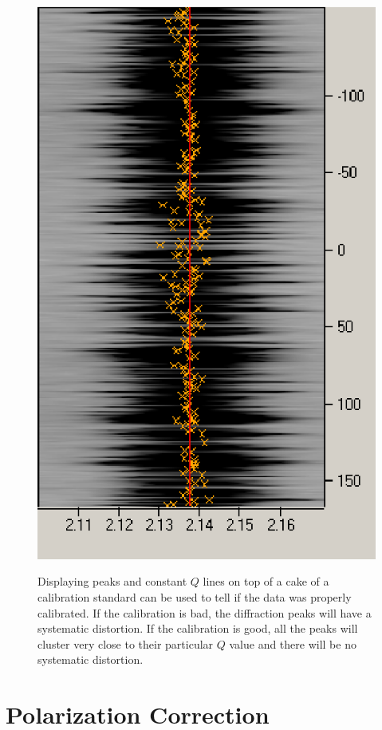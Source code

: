 \begin{figure}[htb]
{    \includegraphics[scale=.75]{figures/good_calibration_cake_zoom_peaks.eps}}		
    \caption{Displaying peaks and constant $Q$ lines on top of a 
    cake of a calibration standard can be used to tell if the data was properly 
    calibrated. If the calibration is bad, the diffraction peaks will have 
    a systematic distortion. If the calibration is good, all the peaks will 
    cluster very close to their particular $Q$ value and there will be no 
    systematic distortion.}
    \label{calibration_cake_zoom}
\end{figure}

\section{Polarization Correction}

